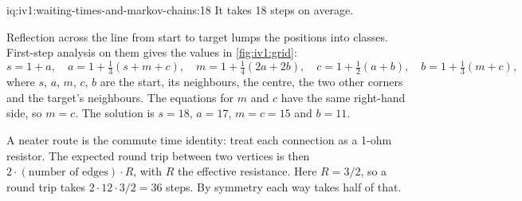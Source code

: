 \begin{solution}{iq:iv1:waiting-times-and-markov-chains:18}
It takes 18 steps on average.

Reflection across the line from start to target lumps the positions into classes. First-step analysis on them gives the values in \cref{fig:iv1:grid}:
\[
s = 1 + a, \quad a = 1 + \tfrac13(s + m + c), \quad m = 1 + \tfrac14(2a + 2b), \quad c = 1 + \tfrac12(a + b), \quad b = 1 + \tfrac13(m + c),
\]
where $s$, $a$, $m$, $c$, $b$ are the start, its neighbours, the centre, the two other corners and the target's neighbours. The equations for $m$ and $c$ have the same right-hand side, so $m = c$. The solution is $s = 18$, $a = 17$, $m = c = 15$ and $b = 11$.

\begin{omfigure}

\label{fig:iv1:grid}
\end{omfigure}

A neater route is the commute time identity: treat each connection as a 1-ohm resistor. The expected round trip between two vertices is then $2 \cdot (\text{number of edges}) \cdot R$, with $R$ the effective resistance. Here $R = 3/2$, so a round trip takes $2 \cdot 12 \cdot 3/2 = 36$ steps. By symmetry each way takes half of that.

\end{solution}

